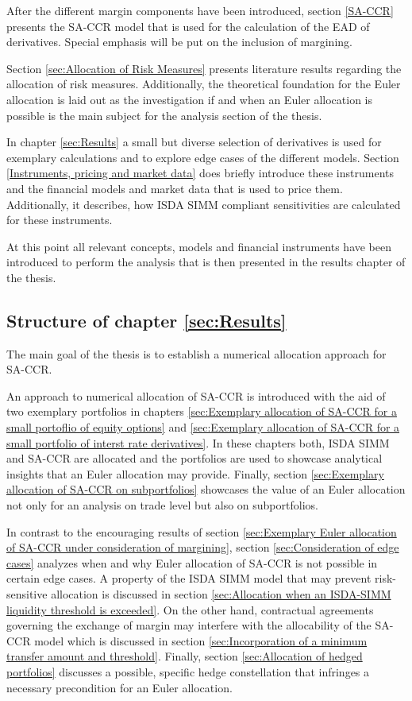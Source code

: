 \documentclass[../Thesis_AHoecherl.tex]{subfiles}
\begin{document}
    After the different margin components have been introduced, section \ref{SA-CCR} presents the \gls{SA-CCR} model that is used for the calculation of the \gls{EAD} of derivatives. Special emphasis will be put on the inclusion of margining.

    Section \ref{sec:Allocation of Risk Measures} presents literature results regarding the allocation of risk measures. Additionally, the theoretical foundation for the Euler allocation is laid out as the investigation if and when an Euler allocation is possible is the main subject for the analysis section of the thesis.

    In chapter \ref{sec:Results} a small but diverse selection of derivatives is used for exemplary calculations and to explore edge cases of the different models. Section \ref{Instruments, pricing and market data} does briefly introduce these instruments and the financial models and market data that is used to price them. Additionally, it describes, how \gls{ISDA SIMM} compliant sensitivities are calculated for these instruments.

    At this point all relevant concepts, models and financial instruments have been introduced to perform the analysis that is then presented in the results chapter of the thesis. 
    
    \subsection{Structure of chapter \ref{sec:Results}}
    
    The main goal of the thesis is to establish a numerical allocation approach for \gls{SA-CCR}.

    An approach to numerical allocation of \gls{SA-CCR} is introduced with the aid of two exemplary portfolios in chapters \ref{sec:Exemplary allocation of SA-CCR for a small portoflio of equity options} and \ref{sec:Exemplary allocation of SA-CCR for a small portfolio of interst rate derivatives}. 
    In these chapters both, \gls{ISDA SIMM} and \gls{SA-CCR} are allocated and the portfolios are used to showcase analytical insights that an Euler allocation may provide. Finally, section \ref{sec:Exemplary allocation of SA-CCR on subportfolios} showcases the value of an Euler allocation not only for an analysis on trade level but also on subportfolios.

    In contrast to the encouraging results of section \ref{sec:Exemplary Euler allocation of SA-CCR under consideration of margining}, section \ref{sec:Consideration of edge cases} analyzes when and why Euler allocation of \gls{SA-CCR} is not possible in certain edge cases.
    A property of the \gls{ISDA SIMM} model that may prevent risk-sensitive allocation is discussed in section \ref{sec:Allocation when an ISDA-SIMM liquidity threshold is exceeded}. 
    On the other hand, contractual agreements governing the exchange of margin may interfere with the allocability of the SA-CCR model which is discussed in section \ref{sec:Incorporation of a minimum transfer amount and threshold}.
    Finally, section \ref{sec:Allocation of hedged portfolios} discusses a possible, specific hedge constellation that infringes a necessary precondition for an Euler allocation.
\end{document}
